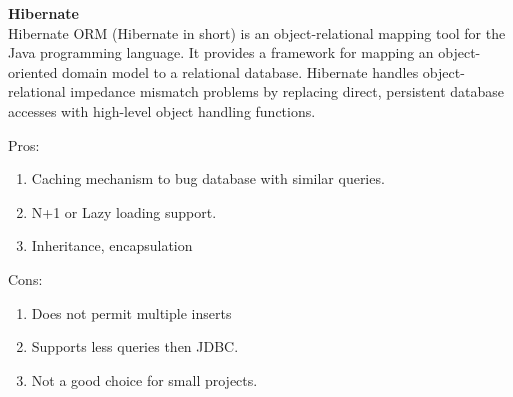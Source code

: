 		\textbf{Hibernate} \\
		Hibernate ORM (Hibernate in short) is an object-relational mapping tool for the Java programming language. It provides a framework for mapping an object-oriented domain model to a relational database. Hibernate handles object-relational impedance mismatch problems by replacing direct, persistent database accesses with high-level object handling functions.
		
		Pros:
		\begin{enumerate}
		\item Caching mechanism to bug database with similar queries.
		\item N+1 or Lazy loading support.
		\item Inheritance, encapsulation
		\end{enumerate}
		Cons:
		\begin{enumerate}
		\item Does not permit multiple inserts
		\item Supports less queries then JDBC.
		\item Not a good choice for small projects.
		\end{enumerate}